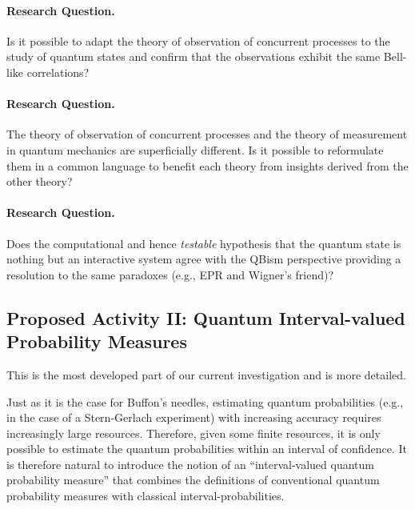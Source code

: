 \documentclass{article}
\theoremstyle{remark}
\begin{document}
\paragraph*{Research Question.} Is it possible to adapt the theory of
observation of concurrent processes to the study of quantum states and
confirm that the observations exhibit the same Bell-like correlations?

\paragraph*{Research Question.} The theory of observation of
concurrent processes and the theory of measurement in quantum
mechanics are superficially different. Is it possible to reformulate
them in a common language to benefit each theory from insights derived
from the other theory?

\paragraph*{Research Question.} Does the computational and hence
\emph{testable} hypothesis that the quantum state is nothing but an
interactive system agree with the QBism perspective providing a
resolution to the same paradoxes (e.g., EPR and Wigner's friend)?

\subsection{Proposed Activity II: Quantum Interval-valued Probability Measures}
 
This is the most developed part of our current investigation and is
more detailed.

Just as it is the case for Buffon's needles, estimating quantum
probabilities (e.g., in the case of a Stern-Gerlach experiment) with
increasing accuracy requires increasingly large resources.  Therefore,
given some finite resources, it is only possible to estimate the
quantum probabilities within an interval of confidence. It is
therefore natural to introduce the notion of an ``interval-valued
quantum probability measure'' that combines the definitions of
conventional quantum probability measures with classical
interval-probabilities.
\end{document}
